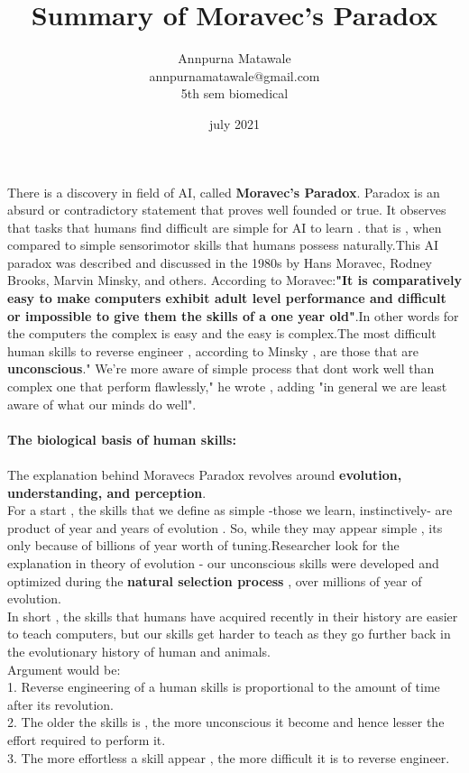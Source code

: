 \documentclass[a4 paper]{article}
\title{Summary of Moravec's Paradox}
\author{Annpurna Matawale\\annpurnamatawale@gmail.com \\5th sem biomedical}
\date{july 2021}
\begin{document}
\maketitle
There is a discovery in field of AI, called \textbf{Moravec's Paradox}. Paradox is an absurd or contradictory statement that proves well founded or true. It observes that tasks that humans find difficult are simple for AI to learn . that is , when compared to simple sensorimotor skills that humans possess naturally.This AI paradox was described and discussed in the 1980s by Hans Moravec, Rodney Brooks, Marvin Minsky, and others. According to Moravec:\textbf{"It is comparatively easy to make computers exhibit adult level performance and difficult or impossible to give them the skills of a one year old"}.In other words for the computers the complex is easy and the easy is complex.The most difficult human skills to reverse engineer , according to Minsky , are those that are \textbf{unconscious}." We're more aware of simple process that dont work well than complex one that perform flawlessly," he wrote , adding "in general we are least aware of what our minds do well".

\paragraph{\textbf{The biological basis of human skills:}}
\paragraph{}
The explanation behind Moravecs Paradox revolves around \textbf{evolution, understanding, and perception}. 
\\For a start , the skills that we define as simple -those we learn, instinctively- are product of year and years of evolution . So, while they may appear simple , its only because of billions of year worth of tuning.Researcher look for the explanation in theory of evolution - our unconscious skills were developed and optimized during the \textbf{natural selection process}
, over millions of year of evolution.\\ In short , the skills that humans have acquired recently in their history are easier to teach computers, but our skills get harder to teach as they go further back in the evolutionary history of human and animals.
\\ Argument would be:
\\1. Reverse engineering of a human skills is proportional to the amount of time after its revolution.\\
2. The older the skills is , the more unconscious it become and hence lesser the effort required to perform it.\\
3. The more effortless a skill appear , the more difficult it is to reverse engineer.
\end{document}
